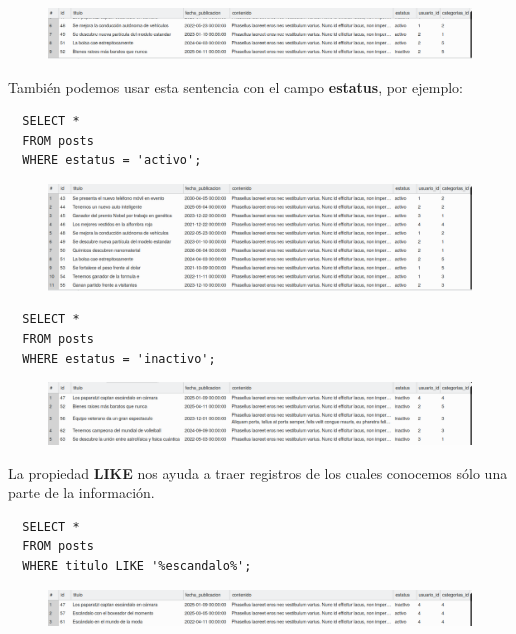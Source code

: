 \documentclass{article}
\begin{document}
\begin{figure}[h!]
  \centering
  \includegraphics[scale=0.5]{./Pictures/107_where_id_dif.png}
\end{figure}


También podemos usar esta sentencia con el campo \textbf{estatus}, por ejemplo:

\begin{verbatim}
  SELECT *
  FROM posts
  WHERE estatus = 'activo';
\end{verbatim}

\begin{figure}[h!]
  \centering
  \includegraphics[scale=0.5]{./Pictures/105_where.png}
\end{figure}

\begin{verbatim}
  SELECT *
  FROM posts
  WHERE estatus = 'inactivo';
\end{verbatim}

\begin{figure}[h!]
  \centering
  \includegraphics[scale=0.5]{./Pictures/106_where_estatus.png}
\end{figure}

La propiedad \textbf{LIKE} nos ayuda a traer registros de los cuales conocemos
sólo una parte de la información.\\

\begin{verbatim}
  SELECT *
  FROM posts
  WHERE titulo LIKE '%escandalo%';
\end{verbatim}

\begin{figure}[h!]
  \centering
  \includegraphics[scale=0.5]{./Pictures/108_where_like.png}
\end{figure}
\end{document}
